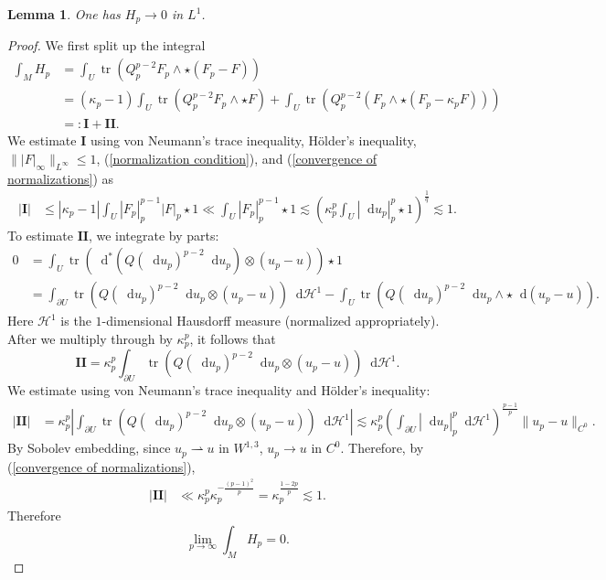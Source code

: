 \documentclass[reqno,11pt]{amsart}
\newcommand*\dif{\mathop{}\!\mathrm{d}}
\DeclareMathOperator{\tr}{tr}
\newtheorem{lemma}[theorem]{Lemma}
\newcommand{\weakto}{\rightharpoonup}
\theoremstyle{definition}
\numberwithin{equation}{section}
\begin{document}
\begin{lemma}\label{decay of tau}
One has $H_p \to 0$ in $L^1$.
\end{lemma}
\begin{proof}
We first split up the integral
\begin{align*}
\int_M H_p
&= \int_U \tr(Q_p^{p - 2} F_p \wedge \star(F_p - F)) \\
&= (\kappa_p - 1) \int_U \tr(Q_p^{p - 2} F_p \wedge \star F) + \int_U \tr(Q_p^{p - 2} (F_p \wedge \star (F_p - \kappa_p F))) \\
&=: \mathbf I + \mathbf{II}.
\end{align*}
We estimate $\mathbf I$ using von Neumann's trace inequality, H\"older's inequality, $\||F|_\infty\|_{L^\infty} \leq 1$, (\ref{normalization condition}), and (\ref{convergence of normalizations}) as 
\begin{align*}
|\mathbf I| &\leq |\kappa_p - 1| \int_U |F_p|_p^{p - 1} |F|_p \star 1 \ll \int_U |F_p|_p^{p - 1} \star 1 \lesssim \left(\kappa_p^p \int_U |\dif u_p|_p^p \star 1\right)^{\frac{1}{q}} \lesssim 1.
\end{align*}
To estimate $\mathbf{II}$, we integrate by parts:
\begin{align*}
0 &= \int_U \tr(\dif^*(Q(\dif u_p)^{p - 2} \dif u_p) \otimes (u_p - u)) \star 1 \\
&= \int_{\partial U} \tr(Q(\dif u_p)^{p - 2} \dif u_p \otimes (u_p - u)) \dif \mathcal H^1 - \int_U \tr(Q(\dif u_p)^{p - 2} \dif u_p \wedge \star \dif (u_p - u)).
\end{align*}
Here $\mathcal H^1$ is the $1$-dimensional Hausdorff measure (normalized appropriately).
After we multiply through by $\kappa_p^p$, it follows that 
$$\mathbf{II} = \kappa_p^p \int_{\partial U} \tr(Q(\dif u_p)^{p - 2} \dif u_p \otimes (u_p - u)) \dif \mathcal H^1.$$
We estimate using von Neumann's trace inequality and H\"older's inequality:
\begin{align*}
|\mathbf{II}| &= \kappa_p^p \left|\int_{\partial U} \tr(Q(\dif u_p)^{p - 2} \dif u_p \otimes (u_p - u)) \dif \mathcal H^1\right|
\lesssim \kappa_p^p \left(\int_{\partial U} |\dif u_p|_p^p \dif \mathcal H^1\right)^{\frac{p - 1}{p}} \|u_p - u\|_{C^0} .
\end{align*}
By Sobolev embedding, since $u_p \weakto u$ in $W^{1, 3}$, $u_p \to u$ in $C^0$.
Therefore, by (\ref{convergence of normalizations}),
\begin{align*}
|\mathbf{II}| &\ll \kappa_p^p \kappa_p^{-\frac{(p - 1)^2}{p}} = \kappa_p^{\frac{1 - 2p}{p}} \lesssim 1. 
\end{align*}
Therefore
$$\lim_{p \to \infty} \int_M H_p = 0.$$


\end{proof}
\end{document}
